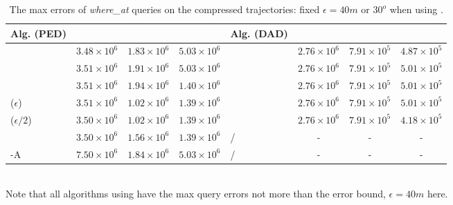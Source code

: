 {\begin{table}
	\caption{\small The max errors of {\emph{where\_at}} queries on the compressed trajectories: fixed $\epsilon=40m$ or $30^o$ when using \dad.}
	\centering
	\scriptsize
	\begin{tabular}{|l|c|c|c|l|c|c|c|}
		\hline
		\bf{Alg. (PED)}  &\ucar &\geolife &\mopsi & \bf{Alg. (DAD)}  &\ucar &\geolife &\mopsi \\
		\hline
		{\dpa} &	$3.48 \times 10^6$ & $1.83 \times 10^6$ &	$5.03 \times 10^6$	& \dpa	& $2.76 \times 10^6$	& $7.91 \times 10^5$	& $4.87 \times 10^5$ \\
		\hline
		{\tpa} &	$3.51 \times 10^6$ & $1.91 \times 10^6$ &	$5.03 \times 10^6$	& \tpa	& $2.76 \times 10^6$	& $7.91 \times 10^5$	& $5.01 \times 10^5$ \\
		\hline
		{\bqsa} &	$3.51 \times 10^6$ & $1.94 \times 10^6$ &	$1.40 \times 10^6$	& \opwa	& $2.76 \times 10^6$	& $7.91 \times 10^5$	& $5.01 \times 10^5$ \\
		\hline
		{\siped($\epsilon$)} &	$3.51 \times 10^6$ & $1.02 \times 10^6$ &	$1.39 \times 10^6$	& \interval	& $2.76 \times 10^6$	& $7.91 \times 10^5$	& $5.01 \times 10^5$ \\
		\hline
		{\siped($\epsilon/2$)} &	$3.50 \times 10^6$ & $1.02 \times 10^6$ &	$1.39 \times 10^6$	& \intersec	& $2.76 \times 10^6$	& $7.91 \times 10^5$	& $4.18 \times 10^5$ \\
		\hline
		{\operb} &	$3.50 \times 10^6$ & $1.56 \times 10^6$ &	$1.39 \times 10^6$	& / & -  & - & -  \\
		\hline
		{\operb-A} &	${7.50\times 10^6} $ & ${1.84\times 10^6} $ & ${5.03\times 10^6} $ & / &- &- &- \\
		\hline
	\end{tabular}
	\label{tab:query-me}
	\vspace{0.5ex}
	\\{Note that all algorithms using \sed have the max query errors not more than the error bound, \ie $\epsilon=40m$ here.}
	\vspace{-1ex}
\end{table} 	 	






}
